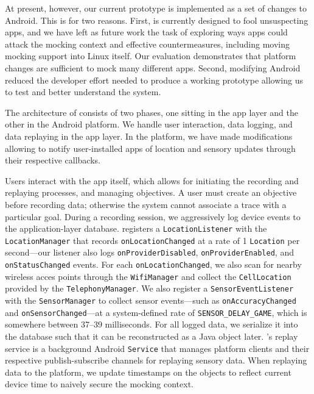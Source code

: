 At present, however, our current \PocketMocker{} prototype is implemented as
a set of changes to Android. This is for two reasons. First, \PocketMocker{}
is currently designed to fool unsuspecting apps, and we have left as future
work the task of exploring ways apps could attack the mocking context and
effective \PocketMocker{} countermeasures, including moving mocking support
into Linux itself. Our evaluation demonstrates that platform changes are
sufficient to mock many different apps. Second, modifying Android reduced the
developer effort needed to produce a working prototype allowing us to test
and better understand the system.


The architecture of \PocketMocker{} consists of two phases, one sitting in the
app layer and the other in the Android platform. We handle user 
interaction, data logging, and data replaying in the app layer.
In the platform, we have made modifications allowing \PocketMocker{} to notify 
user-installed apps of location and sensory updates through their respective 
callbacks.

Users interact with the app itself, which allows for initiating the recording
and replaying processes, and managing objectives. A user must create an
objective before recording data; otherwise the system cannot associate a trace
with a particular goal. During a recording session, we aggressively log device
events to the application-layer database.  \PocketMocker{} registers a
\texttt{LocationListener} with the \texttt{LocationManager} that records
\texttt{onLocationChanged} at a rate of 1 \texttt{Location} per second---our
listener also logs \texttt{onProviderDisabled}, \texttt{onProviderEnabled}, and
\texttt{onStatusChanged} events. For each \texttt{onLocationChanged}, we also
scan for nearby wireless acces points through the \texttt{WifiManager} and
collect the \texttt{CellLocation} provided by the \texttt{TelephonyManager}.
We also register a \texttt{SensorEventListener} with the \texttt{SensorManager}
to collect sensor events---such as \texttt{onAccuracyChanged} and
\texttt{onSensorChanged}---at a system-defined rate of
\texttt{SENSOR\_DELAY\_GAME}, which is somewhere between 37--39 milliseconds.
For all logged data, we serialize it into the database such that it can be
reconstructed as a Java object later. \PocketMocker{}'s replay service is a
background Android \texttt{Service} that manages platform clients and their
respective publish-subscribe channels for replaying sensory data. When
replaying data to the platform, we update timestamps on the objects to reflect
current device time to naively secure the mocking context.

